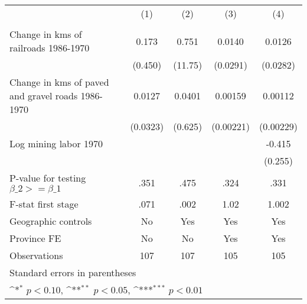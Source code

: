 {
\def\sym#1{\ifmmode^{#1}\else\(^{#1}\)\fi}
\begin{tabular}{l*{4}{c}}
\hline\hline
                &\multicolumn{1}{c}{(1)}&\multicolumn{1}{c}{(2)}&\multicolumn{1}{c}{(3)}&\multicolumn{1}{c}{(4)}\\
                &\multicolumn{1}{c}{}&\multicolumn{1}{c}{}&\multicolumn{1}{c}{}&\multicolumn{1}{c}{}\\
\hline
Change in kms of railroads 1986-1970&    0.173         &    0.751         &   0.0140         &   0.0126         \\
                &  (0.450)         &  (11.75)         & (0.0291)         & (0.0282)         \\
[1em]
Change in kms of paved and gravel roads 1986-1970&   0.0127         &   0.0401         &  0.00159         &  0.00112         \\
                & (0.0323)         &  (0.625)         &(0.00221)         &(0.00229)         \\
[1em]
Log mining labor 1970&                  &                  &                  &   -0.415         \\
                &                  &                  &                  &  (0.255)         \\
\hline
P-value for testing $\beta\_{2} >= \beta\_{1}$&     .351         &     .475         &     .324         &     .331         \\
F-stat first stage&     .071         &     .002         &     1.02         &    1.002         \\
Geographic controls&       No         &      Yes         &      Yes         &      Yes         \\
Province FE     &       No         &       No         &      Yes         &      Yes         \\
Observations    &      107         &      107         &      105         &      105         \\
\hline\hline
\multicolumn{5}{l}{\footnotesize Standard errors in parentheses}\\
\multicolumn{5}{l}{\footnotesize \sym{*} \(p<0.10\), \sym{**} \(p<0.05\), \sym{***} \(p<0.01\)}\\
\end{tabular}
}

